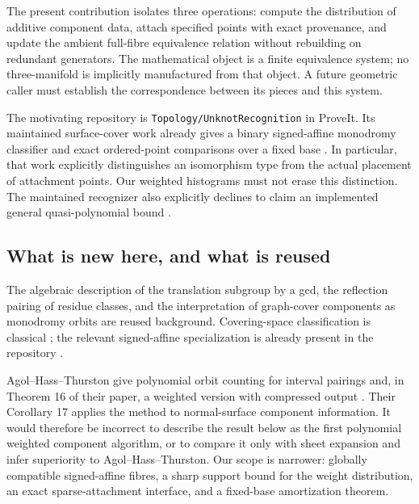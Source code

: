 \documentclass[11pt]{article}
\theoremstyle{definition}
\newcommand{\code}[1]{\texttt{#1}}
\begin{document}
The present contribution isolates three operations: compute the distribution of additive component data, attach specified points with exact provenance, and update the ambient full-fibre equivalence relation without rebuilding on redundant generators. The mathematical object is a finite equivalence system; no three-manifold is implicitly manufactured from that object. A future geometric caller must establish the correspondence between its pieces and this system.

The motivating repository is \code{Topology/UnknotRecognition} in ProveIt. Its maintained surface-cover work already gives a binary signed-affine monodromy classifier and exact ordered-point comparisons over a fixed base \cite{repo-cover,repo-theory}. In particular, that work explicitly distinguishes an isomorphism type from the actual placement of attachment points. Our weighted histograms must not erase this distinction. The maintained recognizer also explicitly declines to claim an implemented general quasi-polynomial bound \cite{repo-readme}.

\subsection{What is new here, and what is reused}
The algebraic description of the translation subgroup by a gcd, the reflection pairing of residue classes, and the interpretation of graph-cover components as monodromy orbits are reused background. Covering-space classification is classical \cite[Section 1.3]{hatcher}; the relevant signed-affine specialization is already present in the repository \cite{repo-theory}.

Agol--Hass--Thurston give polynomial orbit counting for interval pairings and, in Theorem 16 of their paper, a weighted version with compressed output \cite{aht}. Their Corollary 17 applies the method to normal-surface component information. It would therefore be incorrect to describe the result below as the first polynomial weighted component algorithm, or to compare it only with sheet expansion and infer superiority to Agol--Hass--Thurston. Our scope is narrower: globally compatible signed-affine fibres, a sharp support bound for the weight distribution, an exact sparse-attachment interface, and a fixed-base amortization theorem.
\end{document}
